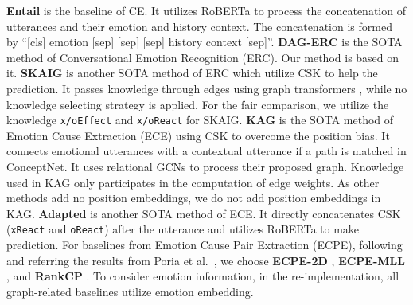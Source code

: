 \documentclass{article}
\begin{document}
\textbf{Entail} is the baseline of CE. It utilizes RoBERTa to process the concatenation of utterances and their emotion and history context. The concatenation is formed by ``[cls] emotion [sep]  [sep]  [sep] history context [sep]''. \textbf{DAG-ERC} \cite{DAG} is the SOTA method of Conversational Emotion Recognition (ERC). Our method is based on it. \textbf{SKAIG} \cite{SKAIG} is another SOTA method of ERC which utilize CSK to help the prediction. It passes knowledge through edges using graph transformers \cite{TransformerConv}, while no knowledge selecting strategy is applied. For the fair comparison, we utilize the knowledge \texttt{x/oEffect} and \texttt{x/oReact} for SKAIG. \textbf{KAG} \cite{KAG} is the SOTA method of Emotion Cause Extraction (ECE) using CSK to overcome the position bias. It connects emotional utterances with a contextual utterance if a path is matched in ConceptNet. It uses relational GCNs to process their proposed graph. Knowledge used in KAG only participates in the computation of edge weights. As other methods add no position embeddings, we do not add position embeddings in KAG. \textbf{Adapted} \cite{AdaptedKnow} is another SOTA method of ECE. It directly concatenates 
CSK (\texttt{xReact} and \texttt{oReact}) after the utterance and utilizes RoBERTa to make prediction. For baselines from Emotion Cause Pair Extraction (ECPE), following and referring the results from Poria et al.~, we choose \textbf{ECPE-2D} \cite{ECPE_2D}, \textbf{ECPE-MLL} \cite{SlidingWindow}, and \textbf{RankCP} \cite{Rank_Emotion}. To consider emotion information, in the re-implementation, all graph-related baselines utilize emotion embedding. 
\end{document}
